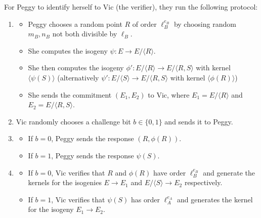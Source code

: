 \documentclass[runningheads,a4paper]{llncs}
\begin{document}
For Peggy to identify herself to Vic (the verifier), they run the following protocol:
\begin{enumerate}
	\item 
	\begin{itemize}
		\item Peggy chooses a random point $R$ of order $\ell_B^{e_B}$ by choosing random $m_B,n_B$ not both divisible by $\ell_B$.

		\item She computes the isogeny $\psi: E \to E/\langle R \rangle$. 

		\item She then computes the isogeny $\phi':E/\langle R \rangle \to E/\langle R,S\rangle$ with kernel $\langle\psi(S)\rangle$ (alternatively $\psi':E/\langle S \rangle \to E/\langle R,S\rangle$ with kernel $\langle\phi(R)\rangle$)

		\item She sends the commitment $(E_1,E_2)$ to Vic, where $E_1 = E/\langle R \rangle$ and $E_2 = E/\langle R,S\rangle$.
	\end{itemize}

	\vspace{2mm}

	\item
	Vic randomly chooses a challenge bit $b \in \{0,1\}$ and sends it to Peggy.

	\vspace{2mm}
	
	\item
	\begin{itemize}
		\item If $b=0$, Peggy sends the response $(R,\phi(R))$.
		\item If $b=1$, Peggy sends the response $\psi(S)$.
	\end{itemize}

	\vspace{2mm}
	
	\item
	\begin{itemize}
		\item If $b=0$, Vic verifies that $R$ and $\phi(R)$ have order $\ell_B^{e_B}$ and generate the kernels for the isogenies $E \to E_1$ and $E/\langle S \rangle \to E_2$ respectively.
		
		\item If $b=1$, Vic verifies that $\psi(S)$ has order $\ell_A^{e_A}$ and generates the kernel for the isogeny $E_1 \to E_2$.
	\end{itemize}
\end{enumerate}
\end{document}
